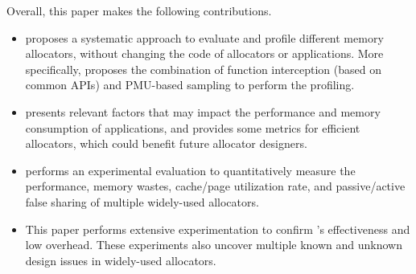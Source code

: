 Overall, this paper makes the following contributions. 

\begin{itemize}
\item \MP{} proposes a systematic approach to evaluate and profile different memory allocators, without changing the code of allocators or applications. More specifically, \MP{} proposes the combination of function interception (based on common APIs) and PMU-based sampling to perform the profiling.


\item \MP{} presents relevant factors that may impact the performance and memory consumption of applications, and provides some metrics for efficient allocators, which could benefit future allocator designers. 

\item \MP{} performs an experimental evaluation to quantitatively measure the performance, memory wastes, cache/page utilization rate, and passive/active false sharing of multiple widely-used allocators. 
\item This paper performs extensive experimentation to confirm \MP{}'s effectiveness and low overhead. These experiments also uncover multiple known and unknown design issues in widely-used allocators.  

\end{itemize} 

